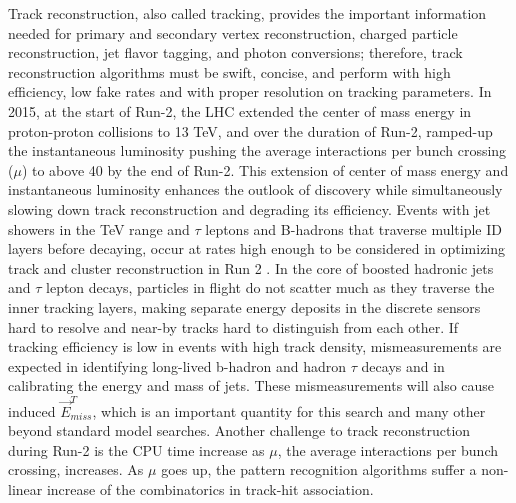 Track reconstruction, also called tracking, provides the important information needed for primary and secondary vertex reconstruction, charged particle reconstruction, jet flavor tagging, and photon conversions; therefore, track reconstruction algorithms must be swift, concise, and perform with high efficiency, low fake rates and with proper resolution on tracking parameters.  In 2015, at the start of Run-2, the LHC extended the center of mass energy in proton-proton collisions to 13 TeV, and over the duration of Run-2, ramped-up the instantaneous luminosity pushing the average interactions per bunch crossing ($\mu$) to above 40 by the end of Run-2.  This extension of center of mass energy and instantaneous luminosity enhances the outlook of discovery while simultaneously slowing down track reconstruction and degrading its efficiency.  Events with jet showers in the TeV range and $\tau$ leptons and B-hadrons that traverse multiple ID layers before decaying, occur at rates high enough to be considered in optimizing track and cluster reconstruction in Run 2 \cite{aad}.  In the core of boosted hadronic jets and $\tau$ lepton decays, particles in flight do not scatter much as they traverse the inner tracking layers, making separate energy deposits in the discrete sensors hard to resolve and near-by tracks hard to distinguish from each other.  If tracking efficiency is low in events with high track density, mismeasurements are expected in identifying long-lived b-hadron and hadron $\tau$ decays and in calibrating the energy and mass of jets.  These mismeasurements will also cause induced $\vec{E}^T_{miss}$, which is an important quantity for this search and many other beyond standard model searches.  Another challenge to track reconstruction during Run-2 is the CPU time increase as $\mu$, the average interactions per bunch crossing, increases.  As $\mu$ goes up, the pattern recognition algorithms suffer a non-linear increase of the combinatorics in track-hit association.  

